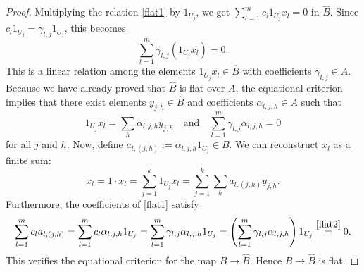 \documentclass[11pt]{amsart}
\newcommand{\eq}[2]{\begin{equation}\label{#1}#2 \end{equation}}
\theoremstyle{plain}
\theoremstyle{definition}
\numberwithin{equation}{prop}
\begin{document}
\begin{proof}
Multiplying the relation \eqref{flat1} by $1_{U_j}$, we get $\sum_{l=1}^m c_l 1_{U_j} x_l = 0$ in $\widehat{B}$. Since $c_l 1_{U_j} = \gamma_{l,j} 1_{U_j}$, this becomes
\eq{flat2}{
\sum_{l=1}^m \gamma_{l,j} (1_{U_j} x_l) = 0.
}
This is a linear relation among the elements $1_{U_j} x_l \in \widehat{B}$ with coefficients $\gamma_{l,j} \in A$. Because we have already proved that $\widehat{B}$ is flat over $A$, the equational criterion implies that there exist elements $y_{j,h} \in \widehat{B}$ and coefficients $\alpha_{l,j,h} \in A$ such that
\[
1_{U_j} x_l = \sum_h \alpha_{l,j,h} y_{j,h} \quad \text{and} \quad \sum_{l=1}^m \gamma_{l,j} \alpha_{l,j,h} = 0
\]
for all $j$ and $h$. Now, define $a_{l, (j,h)} := \alpha_{l,j,h} 1_{U_j} \in B$. We can reconstruct $x_l$ as a finite sum:
\[
x_l = 1 \cdot x_l = \sum_{j=1}^k 1_{U_j} x_l = \sum_{j=1}^k \sum_h a_{l, (j,h)} y_{j,h}.
\]
Furthermore, the coefficients of \eqref{flat1} satisfy
\[
\sum_{l=1}^m c_l a_{l, (j,h)} = \sum_{l=1}^m c_l \alpha_{l,j,h} 1_{U_j} = \sum_{l=1}^m \gamma_{l,j} \alpha_{l,j,h} 1_{U_j} = \left( \sum_{l=1}^m \gamma_{l,j} \alpha_{l,j,h} \right) 1_{U_j} 
\stackrel{\eqref{flat2}}{=} 0.
\]
This verifies the equational criterion for the map $B \to \widehat{B}$. 
Hence $B \to \widehat{B}$ is flat.
\end{proof}
\end{document}

